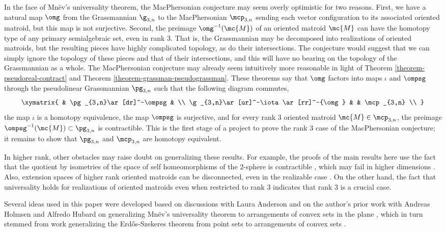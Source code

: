 In the face of Mnëv's universality theorem, the MacPhersonian conjecture may seem overly optimistic for two reasons.
First, we have a natural map $\omg$ from the Grassmannian $\g_{3,n}$ to the MacPhersonian $\mcp_{3,n}$ sending each vector configuration to its associated oriented matroid,
but this map is not surjective. Second, the preimage $\omg^{-1}(\mc{M})$ of an oriented matroid $\mc{M}$ can have the homotopy type of any primary semialgebraic set, even in rank 3.
That is, the Grassmannian may be decomposed into realizations of oriented matroids, but the resulting pieces have highly complicated topology, as do their intersections.
The conjecture would suggest that we can simply ignore the topology of these pieces and that of their intersections, and this will have no bearing on the topology of the Grassmannian as a whole.
The MacPhersonian conjecture may already seem intuitively more reasonable in light of Theorem \ref{theorem-pseudoreal-contract} and Theorem \ref{theorem-grassman-pseudograssman}. These theorems say that $\omg$ factors into maps $\iota$ and $\ompsg$ through the pseudolinear Grassmannian $\pg_{3,n}$ such that the following diagram commutes,
\[
\xymatrix{
& \pg_{3,n}\ar[dr]^-\ompsg & \\
\g_{3,n}\ar[ur]^-\iota\ar[rr]^-{\omg} & & \mcp_{3,n} \\
}
\]
the map $\iota$ is a homotopy equivalence, the map $\ompsg$ is surjective, and for every rank $3$ oriented matroid $\mc{M} \in \mcp_{3,n}$, the preimage $\ompsg^{-1}(\mc{M}) \subset \pg_{3,n}$ is contractible.
This is the first stage of a project to prove the rank $3$ case of the MacPhersonian conjecture; it remains to show that $\pg_{3,n}$ and $\mcp_{3,n}$ are homotopy equivalent.

In higher rank, other obstacles may raise doubt on generalizing these results. For example, the proofs of the main results here use the fact that the quotient by isometries of the space of self homeomorphisms of the $2$-sphere is contractible \cite{kneser1926deformationssatze}, which may fail in higher dimensions \cite[\S 10.12]{kirby1977foundational}.
Also, extension spaces of higher rank oriented matroids can be disconnected, even in the realizable case \cite{liu2020counterexample}.
On the other hand, the fact that universality holds for realizations of oriented matroids even when restricted to rank $3$ indicates that rank $3$ is a crucial case.

Several ideas used in this paper were developed based
on discussions with Laura Anderson and
on the author's prior work with Andreas Holmsen and Alfredo Hubard on generalizing Mnëv's universality theorem to arrangements of convex sets in the plane \cite{dobbins2017realization}, which in turn stemmed from work generalizing the Erdős-Szekeres theorem from point sets to arrangements of convex sets \cite{DobHolHub2014Erdos,dobbins2017realization}.

